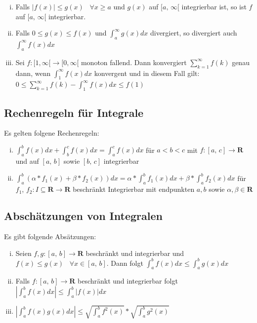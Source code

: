 \documentclass[8pt]{article}
\begin{document}
\begin{multicols*}{3}
\begin{enumerate}[(i)]
  \item Falls $|f(x)| \leq g(x) \;\;\; \forall x \geq a$ und $g(x)$ auf $[a,\,\infty[$ integrierbar ist, so ist $f$ auf $[a,\,\infty[$ integrierbar.
  \item Falls $0 \leq g(x) \leq f(x)$ und $\int_a^\infty g(x) dx$ divergiert, so divergiert auch $\int_a^\infty f(x) dx$
  \item Sei $f:[1, \infty[ \rightarrow [0, \infty[$ monoton fallend. Dann konvergiert $\sum_{k = 1}^\infty f(k)$ genau dann, wenn $\int_1^\infty f(x) dx$ konvergent und in diesem
  Fall gilt: $0 \leq \sum_{k = 1}^\infty f(k) - \int_1^\infty f(x) dx \leq f(1)$
\end{enumerate}

\subsection{Rechenregeln für Integrale}

Es gelten folgene Rechenregeln:
\begin{enumerate}[(i)]
  \item $\int_a^b f(x) dx + \int_b^c f(x) dx = \int_a^c f(x) dx $ für $a < b < c$ mit $f:[a,\,c] \rightarrow \mathbf{R}$ und auf $[a,\,b]$ sowie $[b,\,c]$ integrierbar
  \item $\int_a^b(\alpha * f_1(x) + \beta * f_2(x)) dx = \alpha * \int_a^b f_1(x) dx + \beta * \int_a^b f_2(x) dx$ für $f_1$, $f_2: I \subseteq \mathbf{R} \rightarrow \mathbf{R}$ beschränkt Integrierbar mit endpunkten $a, b$ sowie $\alpha, \beta \in \mathbf{R}$
\end{enumerate}

\subsection{Abschätzungen von Integralen}

Es gibt folgende Absätzungen:
\begin{enumerate}[(i)]
  \item Seien $f, g: [a,\,b] \rightarrow \mathbf{R}$ beschränkt und integrierbar und $f(x) \leq g(x)\;\;\; \forall x \in [a,\,b]$. Dann folgt $\int_a^b f(x) dx \leq \int_a^b g(x) dx$
  \item Falls $f:[a,\,b] \rightarrow \mathbf{R}$ beschränkt und integrierbar folgt $|\int_a^b f(x) dx| \leq \int_a^b |f(x)| dx$
  \item $|\int_a^b f(x)g(x) dx| \leq \sqrt{\int_a^b f^2(x)} * \sqrt{\int_a^b g^2(x)}$
\end{enumerate}


\end{multicols*}
\end{document}

